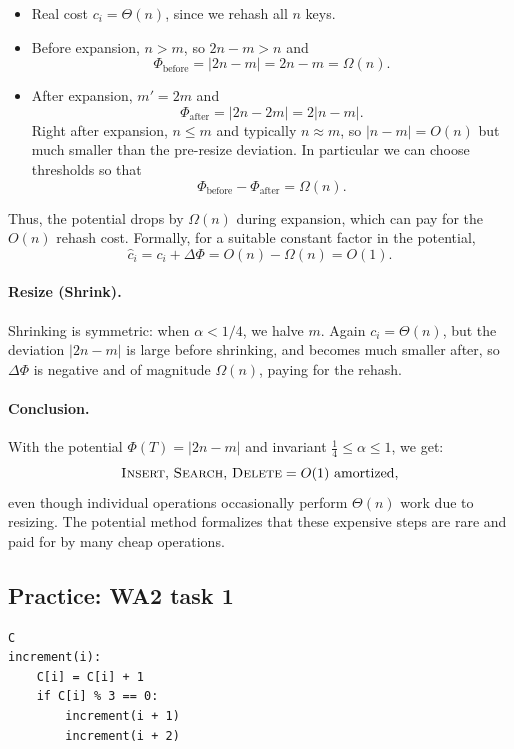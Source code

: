 \documentclass[9pt]{extarticle}
\begin{document}
\begin{itemize}
  \item Real cost $c_i = \Theta(n)$, since we rehash all $n$ keys.
  \item Before expansion, $n > m$, so $2n - m > n$ and
        \[
          \Phi_{\text{before}} = |2n - m| = 2n - m = \Omega(n).
        \]
  \item After expansion, $m' = 2m$ and
        \[
          \Phi_{\text{after}} = |2n - 2m| = 2|n - m|.
        \]
        Right after expansion, $n \le m$ and typically $n \approx m$,
        so $|n-m| = O(n)$ but much smaller than the pre-resize deviation.
        In particular we can choose thresholds so that
        \[
          \Phi_{\text{before}} - \Phi_{\text{after}} = \Omega(n).
        \]
\end{itemize}

Thus, the potential drops by $\Omega(n)$ during expansion,
which can pay for the $O(n)$ rehash cost.
Formally, for a suitable constant factor in the potential,
\[
  \hat c_i = c_i + \Delta\Phi = O(n) - \Omega(n) = O(1).
\]

\paragraph{Resize (Shrink).}
Shrinking is symmetric: when $\alpha < 1/4$, we halve $m$.
Again $c_i = \Theta(n)$, but the deviation $|2n - m|$ is large before shrinking,
and becomes much smaller after, so $\Delta\Phi$ is negative and of magnitude
$\Omega(n)$, paying for the rehash.

\paragraph{Conclusion.}
With the potential
$\Phi(T) = |2n - m|$ and invariant $\tfrac{1}{4} \le \alpha \le 1$, we get:
\[
  \textsc{Insert},\, \textsc{Search},\, \textsc{Delete}
  = O(1) \text{ amortized},
\]
even though individual operations occasionally perform $\Theta(n)$ work due to resizing.
The potential method formalizes that these expensive steps are rare
and paid for by many cheap operations.

\subsection{Practice: WA2 task 1}
\begin{lstlisting}
C
increment(i):
    C[i] = C[i] + 1
    if C[i] % 3 == 0:
        increment(i + 1)
        increment(i + 2)
\end{lstlisting}
\end{document}
